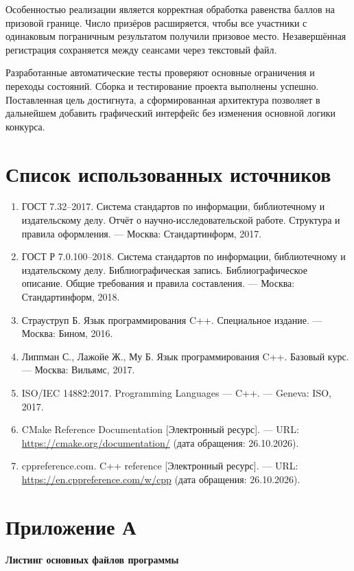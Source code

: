 \documentclass[14pt,a4paper]{extarticle}
\begin{document}
Особенностью реализации является корректная обработка равенства баллов на призовой границе. Число призёров расширяется, чтобы все участники с одинаковым пограничным результатом получили призовое место. Незавершённая регистрация сохраняется между сеансами через текстовый файл.

Разработанные автоматические тесты проверяют основные ограничения и переходы состояний. Сборка и тестирование проекта выполнены успешно. Поставленная цель достигнута, а сформированная архитектура позволяет в дальнейшем добавить графический интерфейс без изменения основной логики конкурса.

\clearpage
\section*{Список использованных источников}

\begin{enumerate}
\item ГОСТ 7.32--2017. Система стандартов по информации, библиотечному и издательскому делу. Отчёт о научно-исследовательской работе. Структура и правила оформления. --- Москва: Стандартинформ, 2017.
\item ГОСТ Р 7.0.100--2018. Система стандартов по информации, библиотечному и издательскому делу. Библиографическая запись. Библиографическое описание. Общие требования и правила составления. --- Москва: Стандартинформ, 2018.
\item Страуструп Б. Язык программирования C++. Специальное издание. --- Москва: Бином, 2016.
\item Липпман С., Лажойе Ж., Му Б. Язык программирования C++. Базовый курс. --- Москва: Вильямс, 2017.
\item ISO/IEC 14882:2017. Programming Languages --- C++. --- Geneva: ISO, 2017.
\item CMake Reference Documentation [Электронный ресурс]. --- URL: \url{https://cmake.org/documentation/} (дата обращения: 26.10.2026).
\item cppreference.com. C++ reference [Электронный ресурс]. --- URL: \url{https://en.cppreference.com/w/cpp} (дата обращения: 26.10.2026).
\end{enumerate}

\clearpage
\section*{Приложение А}
\begin{center}
\textbf{Листинг основных файлов программы}
\end{center}
\end{document}
